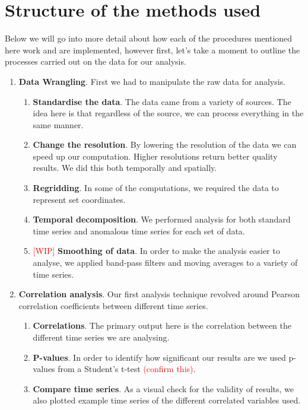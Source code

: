 \documentclass[../main.tex]{subfiles}
\begin{document}
\section{Structure of the methods used}
Below we will go into more detail about how each of the procedures mentioned here work and are implemented, however first, let's take a moment to outline the processes carried out on the data for our analysis.
\begin{enumerate}
    \item \textbf{Data Wrangling}. First we had to manipulate the raw data for analysis. 
    \begin{enumerate}
        \item \textbf{Standardise the data}. The data came from a variety of sources. The idea here is that regardless of the source, we can process everything in the same manner.
        \item \textbf{Change the resolution}. By lowering the resolution of the data we can speed up our computation. Higher resolutions return better quality results. We did this both temporally and spatially.
        \item \textbf{Regridding}. In some of the computations, we required the data to represent set coordinates.
        \item \textbf{Temporal decomposition}. We performed analysis for both standard time series and anomalous time series for each set of data.
        \item \textcolor{red}{[WIP]} \textbf{Smoothing of data}. In order to make the analysis easier to analyse, we applied band-pass filters and moving averages to a variety of time series. 
    \end{enumerate}
    \item \textbf{Correlation analysis}. Our first analysis technique revolved around Pearson correlation coefficients between different time series. 
    \begin{enumerate}
        \item \textbf{Correlations}. The primary output here is the correlation between the different time series we are analysing.
        \item \textbf{P-values}. In order to identify how significant our results are we used p-values from a Student's t-test \textcolor{red}{(confirm this)}.
        \item \textbf{Compare time series}. As a visual check for the validity of results, we also plotted example time series of the different correlated variables used.

\end{enumerate}
\end{enumerate}
\end{document}
